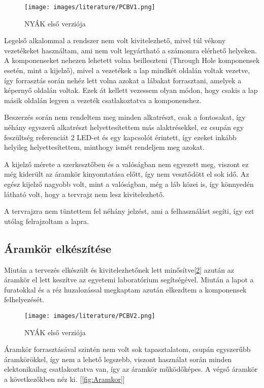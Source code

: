 \begin{figure}[h]
    \centering
    \texttt{[image: images/literature/PCBV1.png]}
    \caption{NYÁK első verziója}
    \label{fig:PCBV1}
\end{figure}

Legelső alkalommal a rendszer nem volt kivitelezhető, mivel túl vékony vezetékeket
használtam, ami nem volt legyártható a számomra elérhető helyeken. A komponenseket 
nehezen lehetett volna beilleszteni (Through Hole komponensek esetén, mint a kijelző),
mivel a vezetékek a lap mindkét oldalán voltak vezetve, így forrasztás során nehéz
lett volna azokat a lábakat forrasztani, amelyek a képernyő oldalán voltak.
Ezek át kellett vezessem olyan módon, hogy csakis a lap másik oldalán legyen a vezeték
csatlakoztatva a komponenshez.

Beszerzés során nem rendeltem meg minden alkatrészt, csak a fontosakat, így néhány
egyszerű alkatrészt helyettesítettem más alaktrésekkel, ez csupán egy feszültség referenciát
2 LED-et és egy kapcsolót érintett, így ezeket inkább helyileg helyettesítettem, minthogy
ismét rendeljem meg azokat.

A kijelző mérete a szerkesztőben és a valóságban nem egyezett meg, viszont ez még 
kiderült az áramkör kinyomtatása előtt, így nem vesztődött el sok idő. Az egész
kijelző nagyobb volt, mint a valóságban, még a láb közei is, így könnyedén látható
volt, hogy a tervrajz nem lesz kivitelezhető.

A tervrajzra nem tüntettem fel néhány jelzést, ami a felhasználást segíti, így ezt 
utólag felrajzoltam a lapra.

\subsection{Áramkör elkészítése}

Miután a tervezés elkészült és kivitelezhetőnek lett minősítve[\ref{fig:PCBV2}] azután az áramkör
el lett keszítve az egyetemi laboratórium segítségével. Miután a lapot a furatokkal és a réz
huzalozással megkaptam azután elkezdtem a komponensek felhelyezését.

\begin{figure}[h]
    \centering
    \texttt{[image: images/literature/PCBV2.png]}
    \caption{NYÁK első verziója}
    \label{fig:PCBV2}
\end{figure}


Áramkör forrasztásával szintén nem volt sok tapasztalatom, csupán egyszerűbb
áramkörökkel, így nem a lehető legszebb, viszont használat során minden elektonikailag
csatlakoztatva van, így az áramkör működőképes. A végső áramkör a következőkben néz ki.
[\ref{fig:Aramkor}]


